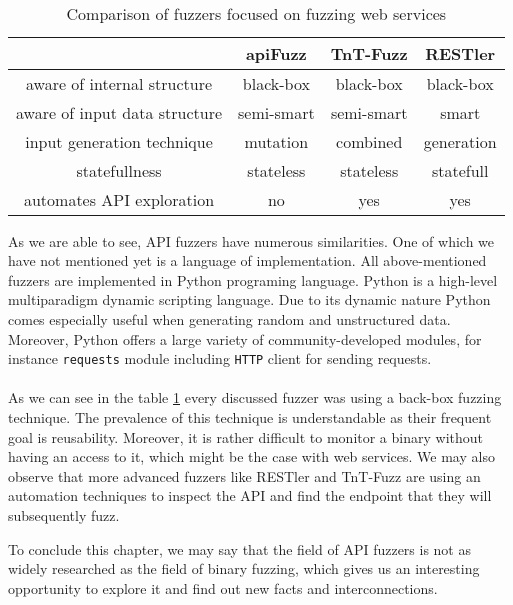 \paragraph{}
\begin{table}[h]
\begin{center}
\begin{tabular}{|c|c c c|}
\hline
                              & apiFuzz    & TnT-Fuzz   & RESTler    \\
\hline
aware of internal structure   & black-box  & black-box  & black-box  \\
aware of input data structure & semi-smart & semi-smart & smart      \\
input generation technique    & mutation   & combined   & generation \\
statefullness                 & stateless  & stateless  & statefull  \\
automates API exploration     & no         & yes        & yes        \\
\hline
\end{tabular}
\caption{Comparison of fuzzers focused on fuzzing web services}
\label{table:fuzzers-comparison}
\end{center}
\end{table}

As we are able to see, API fuzzers have numerous similarities. One of which we have not mentioned yet is a language of implementation. All above-mentioned fuzzers are implemented in Python programing language. Python is a high-level multiparadigm dynamic scripting language. Due to its dynamic nature Python comes especially useful when generating random and unstructured data. Moreover, Python offers a large variety of community-developed modules, for instance \texttt{requests} module including \texttt{HTTP} client for sending requests.

\paragraph{}
As we can see in the table \ref{table:fuzzers-comparison} every discussed fuzzer was using a back-box fuzzing technique. The prevalence of this technique is understandable as their frequent goal is reusability. Moreover, it is rather difficult to monitor a binary without having an access to it, which might be the case with web services. We may also observe that more advanced fuzzers like RESTler and TnT-Fuzz are using an automation techniques to inspect the API and find the endpoint that they will subsequently fuzz.

To conclude this chapter, we may say that the field of API fuzzers is not as widely researched as the field of binary fuzzing, which gives us an interesting opportunity to explore it and find out new facts and interconnections.
